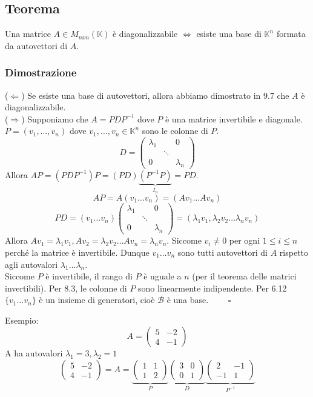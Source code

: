 \documentclass[12pt]{article}
\begin{document}
\subsection{Teorema}

Una matrice $A \in M_{nxn}(\mathbb{K})$ è diagonalizzabile $\iff$ esiste una base di $\mathbb{K}^n$ formata da autovettori di $A$.

\subsubsection{Dimostrazione }
($\Longleftarrow$) Se esiste una base di autovettori, allora abbiamo dimostrato in 9.7 che $A$ è diagonalizzabile.\\
($\Longrightarrow$) Supponiamo che $A = PDP^{-1}$ dove $P$ è una matrice invertibile e diagonale.
$P = (v_1, \dots, v_n)$ dove $v_1, \dots, v_n \in \mathbb{K}^n$ sono le colonne di $P$.
\[D = \begin{pmatrix}
    \lambda_1 & & 0\\
    & \ddots &\\
    0 & & \lambda_n
\end{pmatrix}\]
Allora $AP = (PDP^{-1})P = (PD)\underbrace{(P^{-1}P)}_{I_n} = PD$.
\[AP = A(v_1 \dots v_n) = (Av_1 \dots Av_n)\]
\[PD = (v_1 \dots v_n) \begin{pmatrix}
    \lambda_1 & & 0\\
    & \ddots &\\
    0 & & \lambda_n
\end{pmatrix} = (\lambda_1v_1, \lambda_2v_2 \dots \lambda_n v_n)\]
Allora
$Av_1 = \lambda_1v_1, Av_2 =\lambda_2v_2 \dots Av_n = \lambda_nv_n.$ Siccome $v_i \neq 0$ per ogni $1 \le i \le n$ perché la matrice è invertibile. Dunque $v_1 \dots v_n$ sono tutti autovettori di $A$ rispetto agli autovalori $\lambda_1 \dots \lambda_n$. \\
Siccome $P$ è invertibile, il rango di $P$ è uguale a $n$ (per il teorema delle matrici invertibili). Per 8.3, le colonne di $P$ sono linearmente indipendente. Per 6.12 $\{v_1 \dots v_n\}$ è un insieme di generatori, cioè $\mathcal{B}$ è una base. $\quad \quad \square$

Esempio:
\[A = \begin{pmatrix}
    5 & -2\\
    4 & -1
\end{pmatrix}\]
A ha autovalori $\lambda_1 = 3, \lambda_2 = 1$
\[\begin{pmatrix}
    5 & -2\\
    4 & -1
\end{pmatrix} = A = \underbrace{\begin{pmatrix}
    1 & 1\\
    1 & 2
\end{pmatrix}}_{P}\underbrace{\begin{pmatrix}
    3 & 0\\
    0 & 1
\end{pmatrix}}_{D}\underbrace{\begin{pmatrix}
    2 & -1\\
    -1 & 1
\end{pmatrix}}_{P^{-1}}\]
\end{document}
